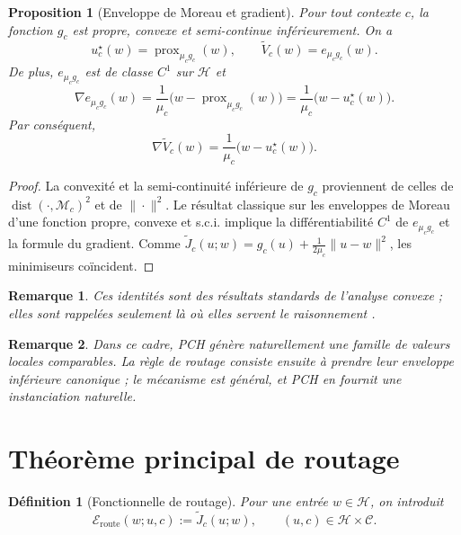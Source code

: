 \documentclass[11pt,a4paper]{article}
\newtheorem{definition}{Définition}[section]
\newtheorem{proposition}{Proposition}[section]
\newtheorem{remark}{Remarque}[section]
\DeclareMathOperator{\prox}{prox}
\DeclareMathOperator{\dist}{dist}
\newcommand{\Hh}{\mathcal H}
\newcommand{\Mcal}{\mathcal M}
\newcommand{\Ccal}{\mathcal C}
\begin{document}
\begin{proposition}[Enveloppe de Moreau et gradient]
Pour tout contexte \(c\), la fonction \(g_c\) est propre, convexe et semi-continue inférieurement. On a
\[
 u_c^\star(w)=\prox_{\mu_c g_c}(w),
\qquad
 \widetilde V_c(w)=e_{\mu_c g_c}(w).
\]
De plus, \(e_{\mu_c g_c}\) est de classe \(C^1\) sur \(\Hh\) et
\[
\nabla e_{\mu_c g_c}(w)=\frac{1}{\mu_c}\bigl(w-\prox_{\mu_c g_c}(w)\bigr)
=\frac{1}{\mu_c}\bigl(w-u_c^\star(w)\bigr).
\]
Par conséquent,
\[
\nabla \widetilde V_c(w)=\frac{1}{\mu_c}\bigl(w-u_c^\star(w)\bigr).
\]
\end{proposition}

\begin{proof}
La convexité et la semi-continuité inférieure de \(g_c\) proviennent de celles de \(\dist(\cdot,\Mcal_c)^2\) et de \(\|\cdot\|^2\). Le résultat classique sur les enveloppes de Moreau d'une fonction propre, convexe et s.c.i. implique la différentiabilité \(C^1\) de \(e_{\mu_c g_c}\) et la formule du gradient. Comme \(\widetilde J_c(u;w)=g_c(u)+\frac{1}{2\mu_c}\|u-w\|^2\), les minimiseurs coïncident.
\end{proof}

\begin{remark}
Ces identités sont des résultats standards de l'analyse convexe ; elles sont rappelées seulement là où elles servent le raisonnement \cite{Moreau1965,Rockafellar1970,BauschkeCombettes2017,RockafellarWets1998}.
\end{remark}

\begin{remark}
Dans ce cadre, PCH génère naturellement une famille de valeurs locales comparables. La règle de routage consiste ensuite à prendre leur enveloppe inférieure canonique ; le mécanisme est général, et PCH en fournit une instanciation naturelle.
\end{remark}

\section{Théorème principal de routage}

\begin{definition}[Fonctionnelle de routage]
Pour une entrée \(w\in\Hh\), on introduit
\[
\mathcal E_{\mathrm{route}}(w;u,c):=\widetilde J_c(u;w),
\qquad (u,c)\in\Hh\times\Ccal.
\]
\end{definition}
\end{document}
